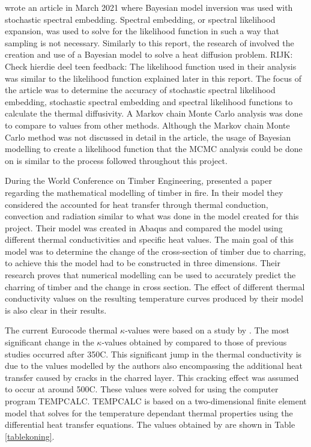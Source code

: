 \citeauthor{Wagner:2021} wrote an article in March 2021 where Bayesian model inversion was used with stochastic spectral embedding.
Spectral embedding, or spectral likelihood expansion, was used to solve for the likelihood function in such a way that sampling is not necessary.
Similarly to this report, the research of \citet{Wagner:2021} involved the creation and use of a Bayesian model to solve a heat diffusion problem.
RIJK:  Check hierdie deel teen feedback:
The likelihood function used in their analysis was similar to the likelihood function explained later in this report.
The focus of the article was to determine the accuracy of stochastic spectral likelihood embedding, stochastic spectral embedding and spectral likelihood functions to calculate the thermal diffusivity.
A Markov chain Monte Carlo analysis was done to compare to values from other methods.
Although the Markov chain Monte Carlo method was not discussed in detail in the article, the usage of Bayesian modelling to create a likelihood function that the MCMC analysis could be done on is similar to the process followed throughout this project.

During the World Conference on Timber Engineering, \citet{Thi:2016} presented a paper regarding the mathematical modelling of timber in fire. 
In their model they considered the accounted for heat transfer through thermal conduction, convection and radiation similar to what was done in the model created for this project.
Their model was created in Abaqus and compared the model using different thermal conductivities and specific heat values.
The main goal of this model was to determine the change of the cross-section of timber due to charring, to achieve this the model had to be constructed in three dimensions.
Their research proves that numerical modelling can be used to accurately predict the charring of timber and the change in cross section.
The effect of different thermal conductivity values on the resulting temperature curves produced by their model is also clear in their results.


The current Eurocode thermal $\kappa$-values were based on a study by \citet{Koning:1999}.
The most significant change in the $\kappa$-values obtained by \citeauthor{Koning:1999} compared to those of previous studies occurred after 350\textdegree C. 
This significant jump in the thermal conductivity is due to the values modelled by the authors also encompassing the additional heat transfer caused by cracks in the charred layer.
This cracking effect was assumed to occur at around 500\textdegree C.
These values were solved for using the computer program TEMPCALC.
TEMPCALC is based on a two-dimensional finite element model that solves for the temperature dependant thermal properties using the differential heat transfer equations.
The values obtained by \citeauthor{Koning:1999} are shown in Table \ref{tablekoning}.

